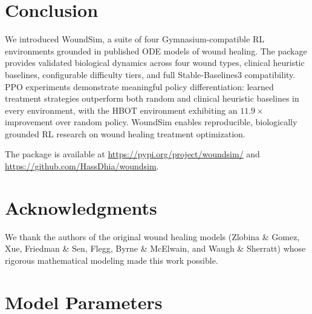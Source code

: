 \documentclass[11pt,a4paper]{article}
\begin{document}
\section{Conclusion}

We introduced WoundSim, a suite of four Gymnasium-compatible RL environments grounded in published ODE models of wound healing. The package provides validated biological dynamics across four wound types, clinical heuristic baselines, configurable difficulty tiers, and full Stable-Baselines3 compatibility. PPO experiments demonstrate meaningful policy differentiation: learned treatment strategies outperform both random and clinical heuristic baselines in every environment, with the HBOT environment exhibiting an $11.9\times$ improvement over random policy. WoundSim enables reproducible, biologically grounded RL research on wound healing treatment optimization.

The package is available at \url{https://pypi.org/project/woundsim/} and \url{https://github.com/HassDhia/woundsim}.

\section*{Acknowledgments}

We thank the authors of the original wound healing models (Zlobina \& Gomez, Xue, Friedman \& Sen, Flegg, Byrne \& McElwain, and Waugh \& Sherratt) whose rigorous mathematical modeling made this work possible.




\appendix

\section{Model Parameters}
\label{app:params}
\end{document}
